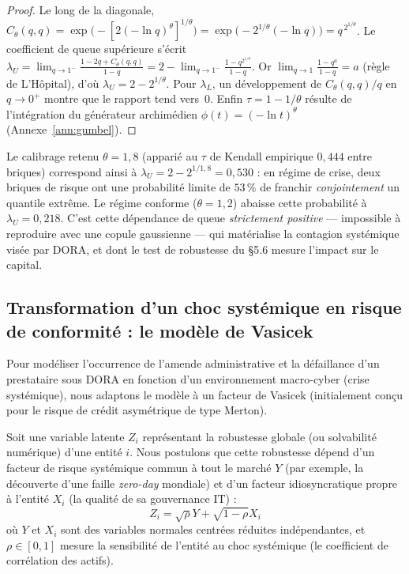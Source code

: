 \documentclass[11pt,a4paper]{article}
\theoremstyle{navystyle}
\theoremstyle{navydef}
\begin{document}
\begin{proof}
Le long de la diagonale, $C_\theta(q,q)=\exp\!\bigl(-[2(-\ln q)^\theta]^{1/\theta}\bigr)=\exp\!\bigl(-2^{1/\theta}(-\ln q)\bigr)=q^{\,2^{1/\theta}}$. Le coefficient de queue supérieure s'écrit $\lambda_U=\lim_{q\to1^-}\frac{1-2q+C_\theta(q,q)}{1-q}=2-\lim_{q\to1^-}\frac{1-q^{2^{1/\theta}}}{1-q}$. Or $\lim_{q\to1}\frac{1-q^a}{1-q}=a$ (règle de L'Hôpital), d'où $\lambda_U=2-2^{1/\theta}$. Pour $\lambda_L$, un développement de $C_\theta(q,q)/q$ en $q\to0^+$ montre que le rapport tend vers~$0$. Enfin $\tau=1-1/\theta$ résulte de l'intégration du générateur archimédien $\phi(t)=(-\ln t)^\theta$ (Annexe~\ref{ann:gumbel}).
\end{proof}

\noindent Le calibrage retenu $\theta=1{,}8$ (apparié au $\tau$ de Kendall empirique $0{,}444$ entre briques) correspond ainsi à $\lambda_U=2-2^{1/1{,}8}=0{,}530$ : en régime de crise, deux briques de risque ont une probabilité limite de $53\,\%$ de franchir \emph{conjointement} un quantile extrême. Le régime conforme ($\theta=1{,}2$) abaisse cette probabilité à $\lambda_U=0{,}218$. C'est cette dépendance de queue \emph{strictement positive} --- impossible à reproduire avec une copule gaussienne --- qui matérialise la contagion systémique visée par DORA, et dont le test de robustesse du §5.6 mesure l'impact sur le capital.

\subsection{Transformation d'un choc systémique en risque de conformité : le modèle de Vasicek}

Pour modéliser l'occurrence de l'amende administrative et la défaillance d'un prestataire sous DORA en fonction d'un environnement macro-cyber (crise systémique), nous adaptons le modèle à un facteur de Vasicek (initialement conçu pour le risque de crédit asymétrique de type Merton).

Soit une variable latente $Z_i$ représentant la robustesse globale (ou solvabilité numérique) d'une entité $i$. Nous postulons que cette robustesse dépend d'un facteur de risque systémique commun à tout le marché $Y$ (par exemple, la découverte d'une faille \textit{zero-day} mondiale) et d'un facteur idiosyncratique propre à l'entité $X_i$ (la qualité de sa gouvernance IT) :
\begin{equation}
Z_i = \sqrt{\rho}Y + \sqrt{1-\rho}X_i
\end{equation}
où $Y$ et $X_i$ sont des variables normales centrées réduites indépendantes, et $\rho \in [0,1]$ mesure la sensibilité de l'entité au choc systémique (le coefficient de corrélation des actifs). 
\end{document}
